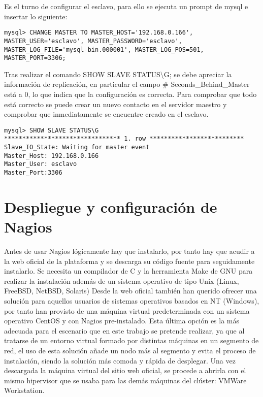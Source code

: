 \documentclass[paper=a4, fontsize=12pt]{scrartcl} %
\begin{document}
Es el turno de configurar el esclavo, para ello se ejecuta un prompt de mysql e insertar lo siguiente:
\begin{lstlisting}
mysql> CHANGE MASTER TO MASTER_HOST='192.168.0.166',
MASTER_USER='esclavo', MASTER_PASSWORD='esclavo',
MASTER_LOG_FILE='mysql-bin.000001', MASTER_LOG_POS=501,
MASTER_PORT=3306;
\end{lstlisting}

Tras realizar el comando SHOW SLAVE STATUS\textbackslash G; se debe apreciar la información de replicación, en particular el campo \# Seconds\_Behind\_Master está a 0, lo que indica que la configuración es correcta.
Para comprobar que todo está correcto se puede crear un nuevo contacto en el servidor maestro y comprobar que inmediatamente se encuentre creado en el esclavo.

\begin{lstlisting}
mysql> SHOW SLAVE STATUS\G
******************************** 1. row **************************
Slave_IO_State: Waiting for master event
Master_Host: 192.168.0.166
Master_User: esclavo
Master_Port:3306

\end{lstlisting}

\section{Despliegue y configuración de Nagios}



Antes de usar Nagios lógicamente hay que instalarlo, por tanto hay que acudir a la web oficial de la plataforma y se descarga su código fuente para seguidamente instalarlo. Se necesita un compilador de C y la herramienta Make de GNU para realizar la instalación además de un sistema operativo de tipo Unix (Linux, FreeBSD, NetBSD, Solaris) \cite{p1}
Desde la web oficial también han querido ofrecer una solución para aquellos usuarios de sistemas operativos basados en NT (Windows), por tanto han provisto de una máquina virtual predeterminada con un sistema operativo CentOS y con Nagios pre-instalado.
Esta última opción es la más adecuada para el escenario que en este trabajo se pretende realizar, ya que al tratarse de un entorno virtual formado por distintas máquinas en un segmento de red, el uso de esta solución añade un nodo más al segmento y evita el proceso de instalación, siendo la solución más comoda y rápida de desplegar. \cite{p2}
Una vez descargada la máquina virtual del sitio web oficial, se procede a abrirla con el mismo hipervisor que se usaba para las demás máquinas del clúster: VMWare Workstation.
\end{document}
